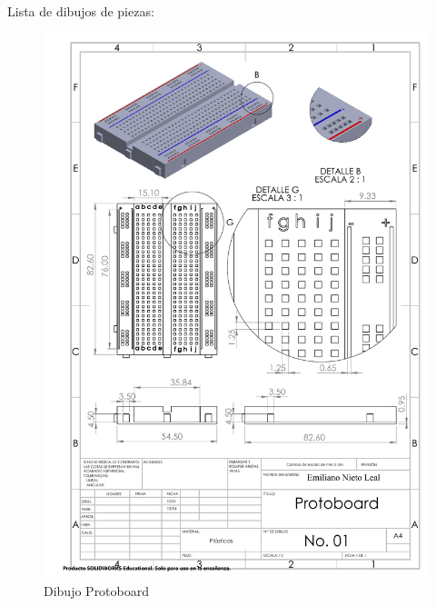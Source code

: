 \begin{itemize}
    \newpage
    Lista de dibujos de piezas:
                \newpage
                \begin{figure}[H]
        \centering
        \includegraphics[trim = {1mm 1mm 1mm 1mm},clip,scale=0.5]{19/Img/protoboardDibujo.pdf}
        \caption{Dibujo Protoboard}
        \label{fig:Dibujo Protoboard}
    \end{figure}
        

\end{itemize}
